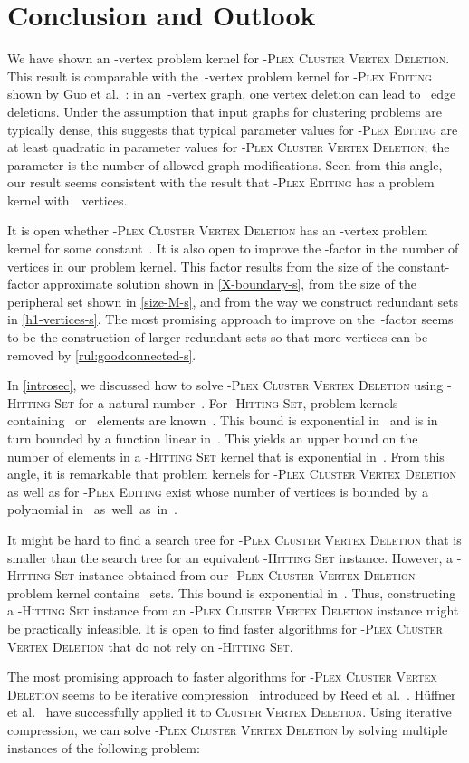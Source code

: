 \documentclass[12pt, a4paper, abstracton]{scrreprt}
\renewcommand{\cite}{~\citep}
\newcommand{\name}{\textsc}
\newcommand{\pvd}[1]{\name{\mbox{-Plex} Cluster Vertex Deletion}}
\newcommand{\cvd}{\name{Cluster Vertex Deletion}}
\newcommand{\hs}[1]{\name{\mbox{-Hitting} Set}}
\theoremstyle{definition}
\theoremstyle{remark}
\begin{document}
\chapter{Conclusion and Outlook}
We have shown an -vertex problem kernel for \pvd s. This result is comparable with the~-vertex problem kernel for \name{-Plex Editing} shown by Guo et al.\cite{DBLP:conf/aaim/GuoKNU09}: in an~-vertex graph, one vertex deletion can lead to~ edge deletions. Under the assumption that input graphs for clustering problems are typically dense, this suggests that typical parameter values for \name{-Plex Editing} are at least quadratic in parameter values for \pvd s; the parameter is the number of allowed graph modifications. Seen from this angle, our result seems consistent with the result that \name{-Plex Editing} has a problem kernel with~~vertices.

It is open whether \pvd s has an -vertex problem kernel for some constant~. It is also open to improve the -factor in the number of vertices in our problem kernel. This factor results from the size of the constant-factor approximate solution shown in \autoref{X-boundary-s}, from the size of the peripheral set shown in \autoref{size-M-s}, and from the way we construct redundant sets in \autoref{h1-vertices-s}. The most promising approach to improve on the~-factor seems to be the construction of larger redundant sets so that more vertices can be removed by \autoref{rul:goodconnected-s}.

In \autoref{introsec}, we discussed how to solve \pvd s using \hs d for a natural number~. For \hs d, problem kernels containing~ or~ elements are known\cite{DBLP:conf/wads/Abu-Khzam07,DBLP:conf/stacs/Kratsch09,Flu06}. This bound is exponential in~ and  is in turn bounded by a function linear in~. This yields an upper bound on the number of elements in a \hs d kernel that is exponential in~. From this angle, it is remarkable that problem kernels for \pvd s as well as for \name{-Plex Editing} exist whose number of vertices is bounded by a polynomial in~ as~well~as~in~.

It might be hard to find a search tree for \pvd s that is smaller than the search tree for an equivalent \hs d instance. However, a \hs d instance obtained from our \pvd s problem kernel contains~ sets. This bound is exponential in~. Thus, constructing a \hs d instance from an \pvd s instance might be practically infeasible. It is open to find faster algorithms for \pvd s that do not rely on \hs d.

The most promising approach to faster algorithms for \pvd s seems to be iterative compression\cite{GMN2009} introduced by Reed et al.\cite{RSV04}.  Hüffner et al.\cite{ HKMN09TOCS} have successfully applied it to \cvd. Using iterative compression, we can solve \pvd s by solving multiple instances of the following problem:
\end{document}
